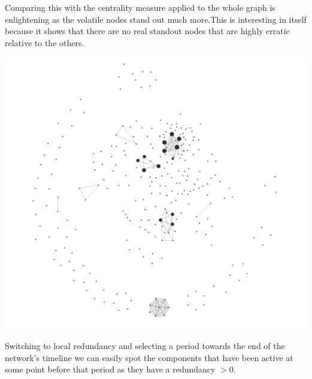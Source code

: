 Comparing this with the centrality measure applied to the whole graph is enlightening as the volatile nodes stand out much more.This is interesting in itself because it shows that there are no real standout nodes that are highly erratic relative to the others.

\begin{center}
\includegraphics[trim={0 0 0 0}, width=140mm]{./Figures/TurinLocalRedundancy1.png}
\end{center}
Switching to local redundancy and selecting a period towards the end of the network's timeline we can easily spot the components that have been active at some point before that period as they have a redundancy $> 0$.

